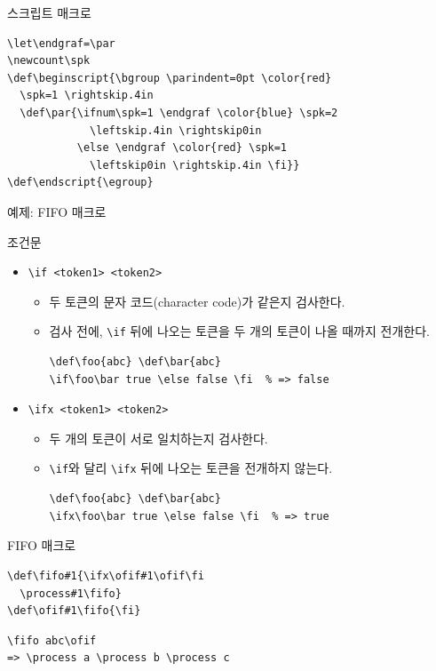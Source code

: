 \documentclass{beamer}
\begin{document}
%
\begin{frame}[fragile]{스크립트 매크로}
  \begin{Verbatim}[fontsize=\small]
\let\endgraf=\par
\newcount\spk
\def\beginscript{\bgroup \parindent=0pt \color{red}
  \spk=1 \rightskip.4in
  \def\par{\ifnum\spk=1 \endgraf \color{blue} \spk=2
             \leftskip.4in \rightskip0in
           \else \endgraf \color{red} \spk=1
             \leftskip0in \rightskip.4in \fi}}
\def\endscript{\egroup}
  \end{Verbatim}
\end{frame}


%
\begin{frame}[standout]
  예제: FIFO 매크로
\end{frame}


%
\begin{frame}[fragile]{조건문}
  \begin{itemize}
  \item \verb+\if <token1> <token2>+
    \begin{itemize}
    \item 두 토큰의 문자 코드(character code)가 같은지 검사한다.
    \item 검사 전에, \verb+\if+ 뒤에 나오는 토큰을 두 개의 토큰이 나올 때까지 전개한다.
      \begin{Verbatim}[fontsize=\small, formatcom=\color{blue}]
\def\foo{abc} \def\bar{abc}
\if\foo\bar true \else false \fi  % => false
      \end{Verbatim}
    \end{itemize}
  \item \verb+\ifx <token1> <token2>+
    \begin{itemize}
    \item 두 개의 토큰이 서로 일치하는지 검사한다.
    \item \verb+\if+와 달리 \verb+\ifx+ 뒤에 나오는 토큰을 전개하지 않는다.
      \begin{Verbatim}[fontsize=\small, formatcom=\color{blue}]
\def\foo{abc} \def\bar{abc}
\ifx\foo\bar true \else false \fi  % => true
      \end{Verbatim}
    \end{itemize}
  \end{itemize}
\end{frame}


%
\begin{frame}[fragile]{FIFO 매크로}
  \begin{Verbatim}[formatcom=\color{blue}]
\def\fifo#1{\ifx\ofif#1\ofif\fi
  \process#1\fifo}
\def\ofif#1\fifo{\fi}
  \end{Verbatim}
  
  \begin{Verbatim}
\fifo abc\ofif
=> \process a \process b \process c
  \end{Verbatim}
\end{frame}
\end{document}
